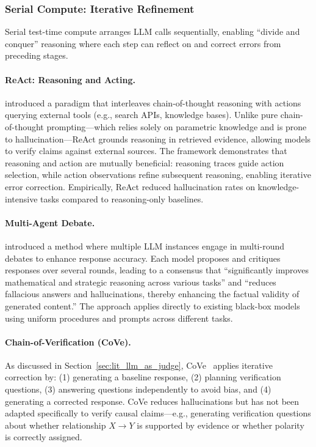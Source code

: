 \subsubsection{Serial Compute: Iterative Refinement}

Serial test-time compute arranges LLM calls sequentially, enabling ``divide and conquer'' reasoning where each step can reflect on and correct errors from preceding stages.

\paragraph{ReAct: Reasoning and Acting.} \citet{yao2023react} introduced a paradigm that interleaves chain-of-thought reasoning with actions querying external tools (e.g., search APIs, knowledge bases). Unlike pure chain-of-thought prompting---which relies solely on parametric knowledge and is prone to hallucination---ReAct grounds reasoning in retrieved evidence, allowing models to verify claims against external sources. The framework demonstrates that reasoning and action are mutually beneficial: reasoning traces guide action selection, while action observations refine subsequent reasoning, enabling iterative error correction. Empirically, ReAct reduced hallucination rates on knowledge-intensive tasks compared to reasoning-only baselines.

\paragraph{Multi-Agent Debate.} \citet{du2023multiagentdebate} introduced a method where multiple LLM instances engage in multi-round debates to enhance response accuracy. Each model proposes and critiques responses over several rounds, leading to a consensus that ``significantly improves mathematical and strategic reasoning across various tasks'' and ``reduces fallacious answers and hallucinations, thereby enhancing the factual validity of generated content.'' The approach applies directly to existing black-box models using uniform procedures and prompts across different tasks.

\paragraph{Chain-of-Verification (CoVe).} As discussed in Section~\ref{sec:lit_llm_as_judge}, CoVe~\citep{dhuliawala2024chain} applies iterative correction by: (1) generating a baseline response, (2) planning verification questions, (3) answering questions independently to avoid bias, and (4) generating a corrected response. CoVe reduces hallucinations but has not been adapted specifically to verify causal claims---e.g., generating verification questions about whether relationship $X \rightarrow Y$ is supported by evidence or whether polarity is correctly assigned.

